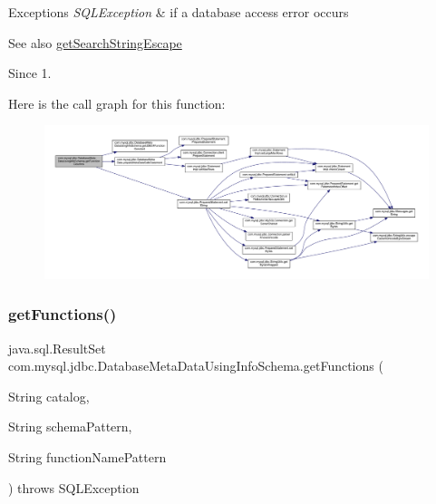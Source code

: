 \begin{DoxyExceptions}{Exceptions}
{\em S\+Q\+L\+Exception} & if a database access error occurs \\
\hline
\end{DoxyExceptions}
\begin{DoxySeeAlso}{See also}
\mbox{\hyperlink{classcom_1_1mysql_1_1jdbc_1_1_database_meta_data_a210b7942557a965c3af550074bb6fe9d}{get\+Search\+String\+Escape}} 
\end{DoxySeeAlso}
\begin{DoxySince}{Since}
1. 
\end{DoxySince}
Here is the call graph for this function\+:
\nopagebreak
\begin{figure}[H]
\begin{center}
\leavevmode
\includegraphics[width=350pt]{classcom_1_1mysql_1_1jdbc_1_1_database_meta_data_using_info_schema_a2fa8933408d13c24d5bb5cc008a40bb0_cgraph}
\end{center}
\end{figure}
\mbox{\label{classcom_1_1mysql_1_1jdbc_1_1_database_meta_data_using_info_schema_a6c98ce4fc7444e6f16442fb9b450fb72}} 
\subsubsection{\texorpdfstring{get\+Functions()}{getFunctions()}}
{\footnotesize\ttfamily java.\+sql.\+Result\+Set com.\+mysql.\+jdbc.\+Database\+Meta\+Data\+Using\+Info\+Schema.\+get\+Functions (\begin{DoxyParamCaption}\item[{String}]{catalog,  }\item[{String}]{schema\+Pattern,  }\item[{String}]{function\+Name\+Pattern }\end{DoxyParamCaption}) throws S\+Q\+L\+Exception}


